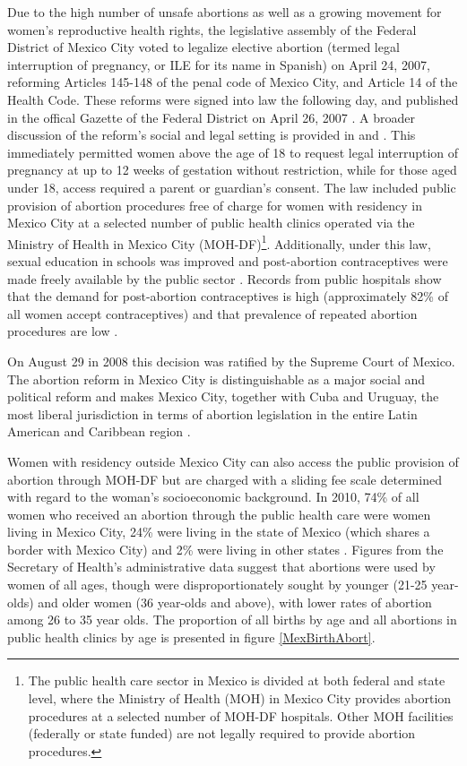\documentclass[a4paper, 11pt]{article}
\begin{document}
\begin{spacing}{2}
Due to the high number of unsafe abortions as well as a growing movement for women's reproductive health rights, the legislative assembly of the Federal District of Mexico City voted to legalize elective abortion (termed legal interruption of pregnancy, or ILE for its name in Spanish) on April 24, 2007, reforming Articles 145-148 of the penal code of Mexico City, and Article 14 of the Health Code.  These reforms were signed into law the following day, and published in the offical Gazette of the Federal District on April 26, 2007 \citep{Gacetta2007}.  A broader discussion of the reform's social and legal setting is provided in \citet{Kulczycki2011, Madrazo2009} and \citet{Johnson2013}.  This immediately permitted women above the age of 18 to request legal interruption of pregnancy at up to 12 weeks of gestation without restriction, while for those aged under 18, access required a parent or guardian's consent. The law included public provision of abortion procedures free of charge for women with residency in Mexico City at a selected number of public health clinics operated via the Ministry of Health in Mexico City (MOH-DF)\footnote{The public health care sector in Mexico is divided at both federal and state level, where the Ministry of Health (MOH) in Mexico City provides abortion procedures at a selected number of MOH-DF hospitals. Other MOH facilities (federally or state funded) are not legally required to provide abortion procedures.}.  Additionally, under this law, sexual education in schools was improved and post-abortion contraceptives were made freely available by the public sector \citep{Contreras2011}. Records from public hospitals show that the demand for post-abortion contraceptives is high (approximately 82\% of all women accept contraceptives) and that prevalence of repeated abortion procedures are low \citep{Becker2013}.

On August 29 in 2008 this decision was ratified by the Supreme Court of Mexico. The abortion reform in Mexico City is distinguishable as a major social and political reform and makes Mexico City, together with Cuba and Uruguay, the most liberal jurisdiction in terms of abortion legislation in the entire Latin American and Caribbean region \citep{Fraser2015}.

Women with residency outside Mexico City can also access the public provision of abortion through MOH-DF but are charged with a sliding fee scale determined with regard to the woman's socioeconomic background. In 2010, 74\% of all women who received an abortion through the public health care were women living in Mexico City, 24\% were living in the state of Mexico (which shares a border with Mexico City) and 2\% were living in other states \citep{Kalb}.  Figures from the Secretary of Health's administrative data suggest that abortions were used by women of all ages, though were disproportionately sought by younger (21-25 year-olds) and older women (36 year-olds and above), with lower rates of abortion among 26 to 35 year olds.  The proportion of all births by age and all abortions in public health clinics by age is presented in figure \ref{MexBirthAbort}.


\end{spacing}
\end{document}
